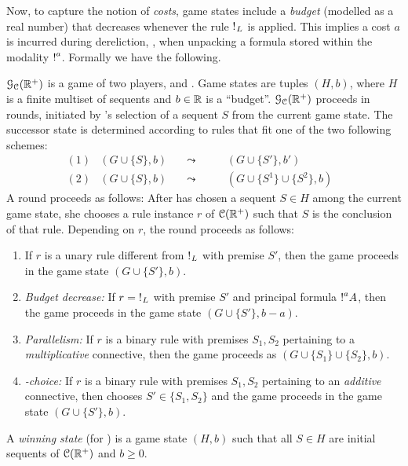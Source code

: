 Now, to capture the notion of {\em costs}, game states include a {\em budget} (modelled as a real number) that decreases whenever the rule $\hbox{$\mathop{!}^{}$}_L$ is applied. This implies a cost $a$ is incurred during dereliction, \ie, when unpacking a formula stored within the modality $\hbox{$\mathop{!}^{a}$}{}$.
%
Formally we have the following.
\begin{definition}\label{definition:GAIMALLR}
    $\mathcal{G}_{\mathcal{C}}(\mathbb{R}^+)$ is a game of two players, \I and \II. Game states are tuples $(H,b)$, where $H$ is a finite multiset of sequents and $b\in\mathbb{R}$ is a ``budget''.
$\mathcal{G}_{\mathcal{C}}(\mathbb{R}^+)$ proceeds in rounds, initiated by \I's selection of a sequent $S$ from the current game state. The successor state is determined according to rules that fit one of the two following schemes:
$$
\begin{array}{lllll}
{(1)} &(G\cup\{S\},b)&\quad\leadsto\quad&  \quad (G\cup\{S'\},b') & \\
{(2)} &(G\cup\{S\},b)&\quad\leadsto\quad&  \quad (G\cup\{S^1\}\cup\{S^2\},b)
\end{array}
$$
A round proceeds as follows: After \I has chosen a sequent $S\in H$ among the current game state, she chooses a rule  instance  $r$ of $\mathcal{C}(\mathbb{R}^+)$ such that $S$ is the conclusion of that rule. Depending on  $r$, the round proceeds as follows:
\begin{enumerate}
\item If $r$ is a unary rule different from $\hbox{$\mathop{!}^{}$}_L$ with premise $S'$, then the game proceeds in the game state $(G\cup\{S'\},b)$.
\item {\em Budget decrease:} If $r=\hbox{$\mathop{!}^{}$}_L$ with premise $S'$ and principal formula $\hbox{$\mathop{!}^{a}$}A$, then the game proceeds in the game state $(G\cup\{S'\},b-a)$.
\item {\em Parallelism:} If $r$ is a binary rule with premises $S_1,S_2$ pertaining to a \emph{multiplicative} connective, then the game proceeds as $(G\cup\{S_1\}\cup\{S_2\},b)$.
\item {\em \II-choice:} If $r$ is a binary rule with premises $S_1,S_2$ pertaining to an \emph{additive} connective, then \II chooses $S'\in\{S_1,S_2\}$ and the game proceeds in the game state $(G\cup\{S'\},b)$.
\end{enumerate}

\noindent A {\em winning state} (for \I) is a game state $(H,b)$ such that all $S\in H$ are initial sequents of $\mathcal{C}(\mathbb{R}^+)$ and $b\geq 0$.
\end{definition}

